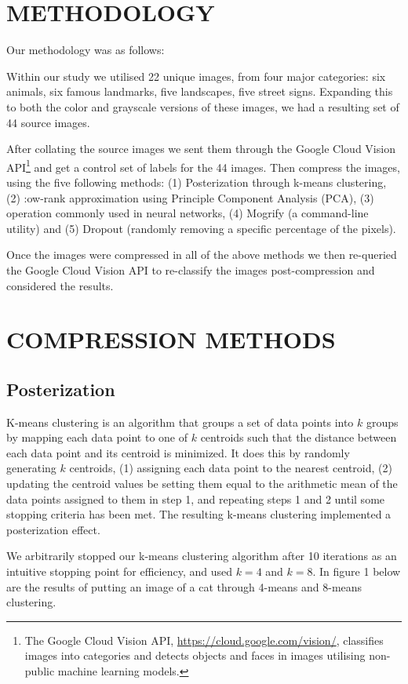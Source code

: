 \documentclass[letterpaper, 10 pt, conference]{ieeeconf}  %
\begin{document}
\section{METHODOLOGY}
Our methodology was as follows:

Within our study we utilised 22 unique images, from four major
categories: six animals, six famous landmarks, five landscapes, five
street signs. Expanding this to both the color and grayscale
versions of these images, we had a resulting set of 44 source images.

After collating the source images we sent them through the Google Cloud Vision API\footnote{The Google Cloud Vision API, \url{https://cloud.google.com/vision/}, classifies images into categories and detects objects and faces in images utilising non-public machine learning models.}
and get a control set of labels for the 44 images. Then compress the images, using the five following methods:
(1) Posterization through k-means clustering,
(2) :ow-rank approximation using Principle Component Analysis (PCA),
(3)  operation commonly used in neural networks,
(4) Mogrify (a command-line utility)
and (5) Dropout (randomly removing a specific percentage of the pixels).

Once the images were compressed in all of the above methods we then re-queried the Google Cloud Vision API to re-classify the images post-compression and considered the results.

\section{COMPRESSION METHODS}
\subsection{Posterization}
K-means clustering is an algorithm that groups
a set of data points into $k$ groups by mapping each data point
to one of $k$ centroids such that the distance between each data point
and its centroid is minimized. It does this by randomly generating $k$
centroids, (1) assigning each data point to the nearest centroid,
(2) updating the centroid values be setting them equal to the arithmetic
mean of the data points assigned to them in step 1, and repeating steps
1 and 2 until some stopping criteria has been met. The resulting k-means clustering implemented a posterization
effect.

We arbitrarily stopped our k-means clustering algorithm after 10 iterations as an intuitive stopping point for efficiency, and used $k=4$ and $k=8$. In figure 1 below are the results of putting an image of a cat through 4-means and 8-means clustering.
\end{document}
